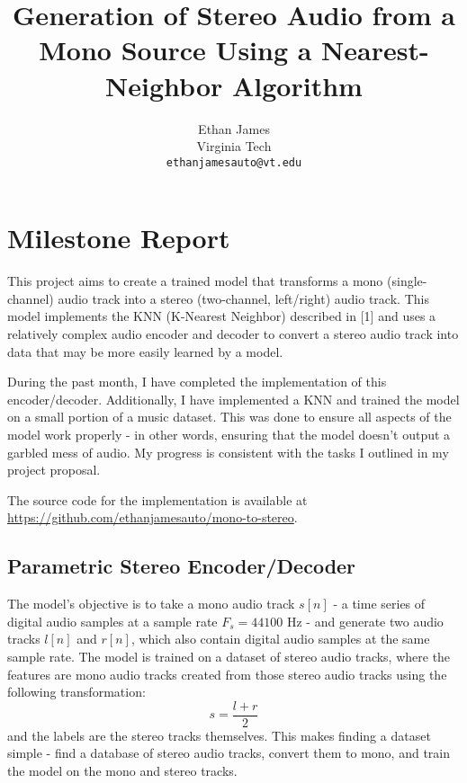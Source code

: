 \documentclass{article}
\title{Generation of Stereo Audio from a Mono Source Using
a Nearest-Neighbor Algorithm}
\author{%
  Ethan James \\
  Virginia Tech\\
  \texttt{ethanjamesauto@vt.edu} \\
}
\begin{document}
\maketitle


\section{Milestone Report}

This project aims to create a trained model that transforms a mono (single-channel) audio track into a stereo (two-channel, left/right) audio track. This model implements the KNN (K-Nearest Neighbor) described in [1] and uses a relatively complex audio encoder and decoder to convert a stereo audio track into data that may be more easily learned by a model.

During the past month, I have completed the implementation of this encoder/decoder. Additionally, I have implemented a KNN and trained the model on a small portion of a music dataset. This was done to ensure all aspects of the model work properly - in other words, ensuring that the model doesn't output a garbled mess of audio. My progress is consistent with the tasks I outlined in my project proposal.

The source code for the implementation is available at \url{https://github.com/ethanjamesauto/mono-to-stereo}.

\subsection{Parametric Stereo Encoder/Decoder}

The model's objective is to take a mono audio track $s[n]$ - a time series of digital audio samples at a sample rate $F_s=44100$ Hz - and generate two audio tracks $l[n]$ and $r[n]$, which also contain digital audio samples at the same sample rate. The model is trained on a dataset of stereo audio tracks, where the features are mono audio tracks created from those stereo audio tracks using the following transformation:
$$s = \frac{l+r}{2}$$
and the labels are the stereo tracks themselves. This makes finding a dataset simple - find a database of stereo audio tracks, convert them to mono, and train the model on the mono and stereo tracks.
\end{document}
